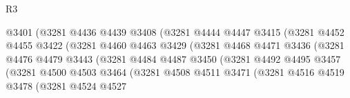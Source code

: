 \begin{lexlean}{R3}
\begin{coremodule}
                                    @3401
                                    (@3281
                                      @4436
                                      @4439
                                      @3408
                                      (@3281
                                        @4444
                                        @4447
                                        @3415
                                        (@3281
                                          @4452
                                          @4455
                                          @3422
                                          (@3281
                                            @4460
                                            @4463
                                            @3429
                                            (@3281
                                              @4468
                                              @4471
                                              @3436
                                              (@3281
                                                @4476
                                                @4479
                                                @3443
                                                (@3281
                                                  @4484
                                                  @4487
                                                  @3450
                                                  (@3281
                                                    @4492
                                                    @4495
                                                    @3457
                                                    (@3281
                                                      @4500
                                                      @4503
                                                      @3464
                                                      (@3281
                                                        @4508
                                                        @4511
                                                        @3471
                                                        (@3281
                                                          @4516
                                                          @4519
                                                          @3478
                                                          (@3281
                                                            @4524
                                                            @4527

\end{coremodule}
\end{lexlean}
